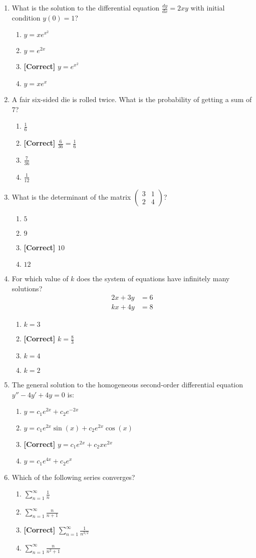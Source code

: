 \documentclass{article}
\newenvironment{problem}{\item}{}
\newcommand{\choice}{\item}
\newcommand{\correctchoice}{\item \textbf{[Correct] }}
\begin{document}
\begin{enumerate}
\begin{problem}
What is the solution to the differential equation $\frac{dy}{dx} = 2xy$ with initial condition $y(0) = 1$?
\begin{enumerate}
\choice $y = xe^{x^2}$
\choice $y = e^{2x}$
\correctchoice $y = e^{x^2}$
\choice $y = xe^x$
\end{enumerate}
\end{problem}

\begin{problem}
A fair six-sided die is rolled twice. What is the probability of getting a sum of 7?
\begin{enumerate}
\choice $\frac{1}{6}$
\correctchoice $\frac{6}{36} = \frac{1}{6}$
\choice $\frac{7}{36}$
\choice $\frac{1}{12}$
\end{enumerate}
\end{problem}

\begin{problem}
What is the determinant of the matrix $\begin{pmatrix} 3 & 1 \\ 2 & 4 \end{pmatrix}$?
\begin{enumerate}
\choice $5$
\choice $9$
\correctchoice $10$
\choice $12$
\end{enumerate}
\end{problem}

\begin{problem}
For which value of $k$ does the system of equations have infinitely many solutions?
\begin{align}
2x + 3y &= 6 \\
kx + 4y &= 8
\end{align}
\begin{enumerate}
\choice $k = 3$
\correctchoice $k = \frac{8}{3}$
\choice $k = 4$
\choice $k = 2$
\end{enumerate}
\end{problem}

\begin{problem}
The general solution to the homogeneous second-order differential equation $y'' - 4y' + 4y = 0$ is:
\begin{enumerate}
\choice $y = c_1e^{2x} + c_2e^{-2x}$
\choice $y = c_1e^{2x}\sin(x) + c_2e^{2x}\cos(x)$
\correctchoice $y = c_1e^{2x} + c_2xe^{2x}$
\choice $y = c_1e^{4x} + c_2e^x$
\end{enumerate}
\end{problem}

\begin{problem}
Which of the following series converges?
\begin{enumerate}
\choice $\sum_{n=1}^{\infty} \frac{1}{n}$
\choice $\sum_{n=1}^{\infty} \frac{n}{n+1}$
\correctchoice $\sum_{n=1}^{\infty} \frac{1}{n^{3/2}}$
\choice $\sum_{n=1}^{\infty} \frac{n}{n^2+1}$
\end{enumerate}
\end{problem}

\end{enumerate}
\end{document}
